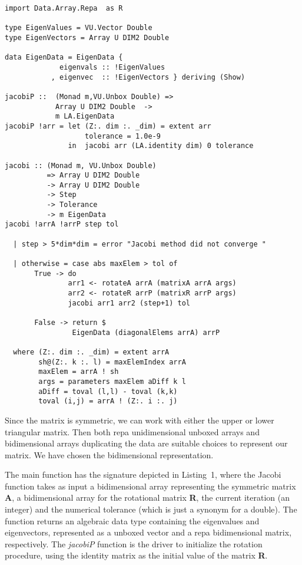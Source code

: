 \documentclass{tmr}
\begin{document}
\begin{lstlisting}[float,captionpos=b,belowcaptionskip=4pt, caption= Jacobi Method]
import Data.Array.Repa  as R

type EigenValues = VU.Vector Double
type EigenVectors = Array U DIM2 Double

data EigenData = EigenData {
             eigenvals :: !EigenValues
           , eigenvec  :: !EigenVectors } deriving (Show)

jacobiP ::  (Monad m,VU.Unbox Double) =>
            Array U DIM2 Double  ->
            m LA.EigenData
jacobiP !arr = let (Z:. dim :. _dim) = extent arr
                   tolerance = 1.0e-9
               in  jacobi arr (LA.identity dim) 0 tolerance

jacobi :: (Monad m, VU.Unbox Double)
          => Array U DIM2 Double
          -> Array U DIM2 Double
          -> Step
          -> Tolerance
          -> m EigenData
jacobi !arrA !arrP step tol

  | step > 5*dim*dim = error "Jacobi method did not converge "

  | otherwise = case abs maxElem > tol of
       True -> do
               arr1 <- rotateA arrA (matrixA arrA args)
               arr2 <- rotateR arrP (matrixR arrP args)
               jacobi arr1 arr2 (step+1) tol

       False -> return $
                EigenData (diagonalElems arrA) arrP

  where (Z:. dim :. _dim) = extent arrA
        sh@(Z:. k :. l) = maxElemIndex arrA
        maxElem = arrA ! sh
        args = parameters maxElem aDiff k l
        aDiff = toval (l,l) - toval (k,k)
        toval (i,j) = arrA ! (Z:. i :. j)
\end{lstlisting}

Since the matrix is symmetric, we can work with either the upper or
lower triangular matrix.
%
Then both repa unidimensional unboxed arrays and bidimensional arrays
duplicating the data are suitable choices to represent our matrix.
%
We have chosen the bidimensional representation.

The main function has the signature depicted in Listing~1,
where the Jacobi function takes as input a bidimensional array
representing the symmetric matrix {\textbf A}, a bidimensional array for
the rotational matrix {\textbf R}, the current iteration (an integer) and
the numerical tolerance (which is just a synonym for a double).
%
The function returns an algebraic data type containing the eigenvalues
and eigenvectors, represented as a unboxed vector and a repa
bidimensional matrix, respectively.
%
The \textit{jacobiP} function is the driver to initialize the rotation
procedure, using the identity matrix as the initial value of the matrix
\textbf{R}.
\end{document}
